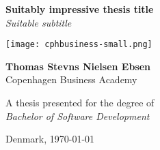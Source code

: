 \begin{titlepage}
    \begin{center}
        \vspace*{1cm}
        \linespread{1.5}

        \Huge
        \textbf{Suitably impressive thesis title}\\
        \Large
        \emph{Suitable subtitle}

        
        \vfill

        \texttt{[image: cphbusiness-small.png]}

        \vfill

        \textbf{Thomas Stevns Nielsen Ebsen}\\
        Copenhagen Business Academy

        \vspace{1.5cm}

        A thesis presented for the degree of\\
        \emph{Bachelor of Software Development}

        Denmark, \today

        \linespread{1}
    \end{center}
\end{titlepage}